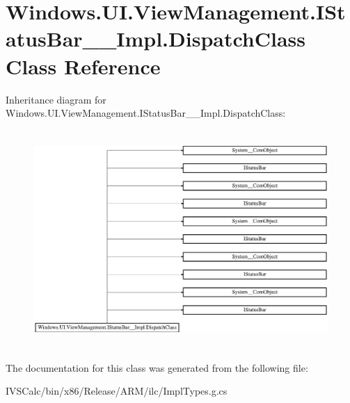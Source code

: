 \hypertarget{class_windows_1_1_u_i_1_1_view_management_1_1_i_status_bar_____impl_1_1_dispatch_class}{}\section{Windows.\+U\+I.\+View\+Management.\+I\+Status\+Bar\+\_\+\+\_\+\+Impl.\+Dispatch\+Class Class Reference}
\label{class_windows_1_1_u_i_1_1_view_management_1_1_i_status_bar_____impl_1_1_dispatch_class}
Inheritance diagram for Windows.\+U\+I.\+View\+Management.\+I\+Status\+Bar\+\_\+\+\_\+\+Impl.\+Dispatch\+Class\+:\begin{figure}[H]
\begin{center}
\leavevmode
\includegraphics[height=8.324325cm]{class_windows_1_1_u_i_1_1_view_management_1_1_i_status_bar_____impl_1_1_dispatch_class}
\end{center}
\end{figure}


The documentation for this class was generated from the following file\+:\begin{DoxyCompactItemize}
\item 
I\+V\+S\+Calc/bin/x86/\+Release/\+A\+R\+M/ilc/Impl\+Types.\+g.\+cs\end{DoxyCompactItemize}
